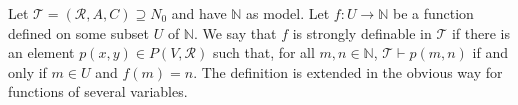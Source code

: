 Let $\mathcal{T} = (\mathcal{R}, A, C) \supseteq N_0$ and have $\mathbb{N}$ as model. Let $f: U \rightarrow \mathbb{N}$ be a function defined on some subset $U$ of $\mathbb{N}$. We say that $f$ is strongly definable in $\mathcal{T}$ if there is an element $p(x, y) \in P(V, \mathcal{R})$ such that, for all $m, n \in \mathbb{N}$, $\mathcal{T} \vdash p(m, n)$ if and only if $m \in U$ and $f(m) = n$. The definition is extended in the obvious way for functions of several variables.
